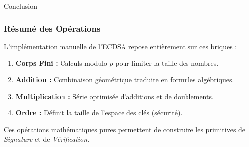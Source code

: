 \begin{frame}{Conclusion}
\frametitle{Résumé des Opérations}

L'implémentation manuelle de l'ECDSA repose entièrement sur ces briques :

\begin{enumerate}
    \item \textbf{Corps Fini :} Calculs modulo $p$ pour limiter la taille des nombres.
    \item \textbf{Addition :} Combinaison géométrique traduite en formules algébriques.
    \item \textbf{Multiplication :} Série optimisée d'additions et de doublements.
    \item \textbf{Ordre :} Définit la taille de l'espace des clés (sécurité).
\end{enumerate}

Ces opérations mathématiques pures permettent de construire les primitives de \textit{Signature} et de \textit{Vérification}.
\end{frame}
